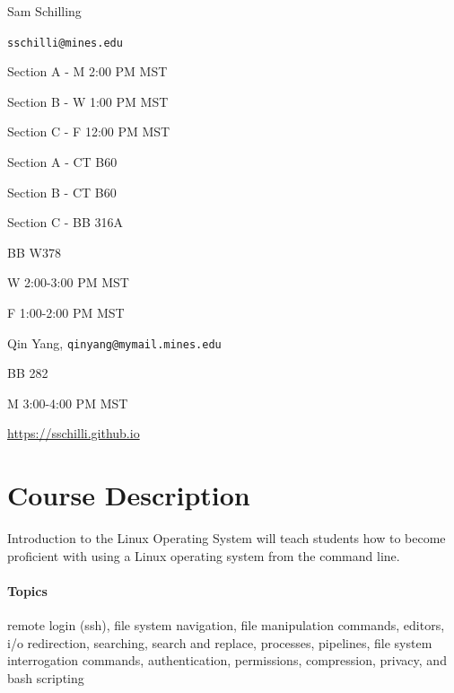 \documentclass[12pt]{article}
\begin{document}
  \maketitle
\begin{description}
  \item[Instructor] Sam Schilling
  \item[Email] \texttt{sschilli@mines.edu}
  \item[Lecture Times]
  
  \item Section A - M 2:00  PM MST
  \item Section B - W 1:00  PM MST
  \item Section C - F 12:00 PM MST
  
  \item[Classrooms]
  
  \item Section A - CT B60
  \item Section B - CT B60
  \item Section C - BB 316A
  
  \item[Office Hours] BB W378 
  
  \item W 2:00-3:00 PM MST
  \item F 1:00-2:00 PM MST
  \item[TA] Qin Yang, \texttt{qinyang@mymail.mines.edu}
  \item[TA Office Hours] BB 282 
  \item M 3:00-4:00 PM MST
  \item[Course Webpage] \href{https://sschilli.github.io}{https://sschilli.github.io}
\end{description}
\section{Course Description}
Introduction to the Linux Operating System will teach students how to become proficient with using a Linux operating system from the command
line.

\paragraph{Topics} remote login (ssh), file system navigation, file manipulation commands, editors, i/o redirection, searching, search and replace,
processes, pipelines, file system interrogation commands, authentication, permissions, compression, privacy, and bash scripting
\end{document}
